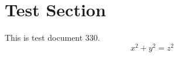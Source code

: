 \documentclass{article}
\begin{document}
\section{Test Section}
This is test document 330.
\begin{equation}
x^2 + y^2 = z^2
\end{equation}
\end{document}
